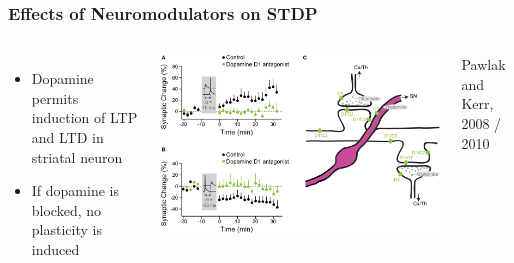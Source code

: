 \documentclass{beamer}
\begin{document}
\begin{frame}
\frametitle{Effects of Neuromodulators on STDP}

    \begin{columns}[T]
    

    \begin{itemize}
            \item Dopamine permits induction of LTP and LTD in striatal neuron 
            \item If dopamine is blocked, no plasticity is induced
    \end{itemize}

    \includegraphics[width=\textwidth]{./figures/dopa_blocked}

    \tiny{Pawlak and Kerr, 2008 / 2010}

  \end{columns}


\end{frame}
\end{document}
